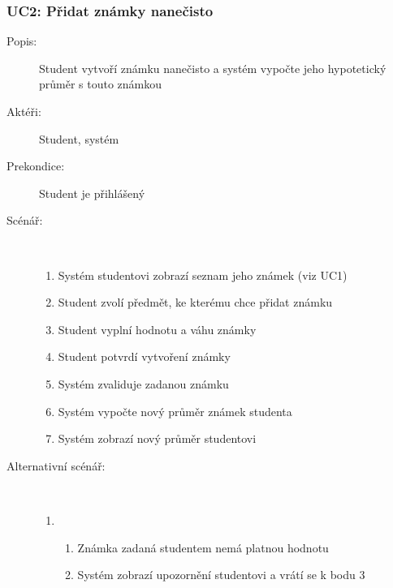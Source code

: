 \documentclass[a4paper,10pt]{article}
\begin{document}
	\subsubsection*{UC2: Přidat známky nanečisto}
	\begin{description}
		\item[Popis:] Student vytvoří známku nanečisto a systém vypočte jeho hypotetický průměr s touto známkou
		\item[Aktéři:] Student, systém
		\item[Prekondice:] Student je přihlášený
		\item[Scénář:] \hfill \\
				\begin{enumerate}
					\item Systém studentovi zobrazí seznam jeho známek (viz UC1)
					\item Student zvolí předmět, ke kterému chce přidat známku
					\item Student vyplní hodnotu a váhu známky
					\item Student potvrdí vytvoření známky
					\item Systém zvaliduje zadanou známku
					\item Systém vypočte nový průměr známek studenta
					\item Systém zobrazí nový průměr studentovi
				\end{enumerate}
		\item[Alternativní scénář:] \hfill \\
				\begin{enumerate}
					\setcounter{enumi}{5}
					\setcounter{enumii}{1}
					\begin{enumerate}[label*=\arabic*.,leftmargin=8pt]
						\item
							\begin{enumerate}[label=\alph*.]
								\item Známka zadaná studentem nemá platnou hodnotu
								\item Systém zobrazí upozornění studentovi a vrátí se k bodu 3
							\end{enumerate}
					\end{enumerate}		
				\end{enumerate}
	\end{description}
\end{document}
